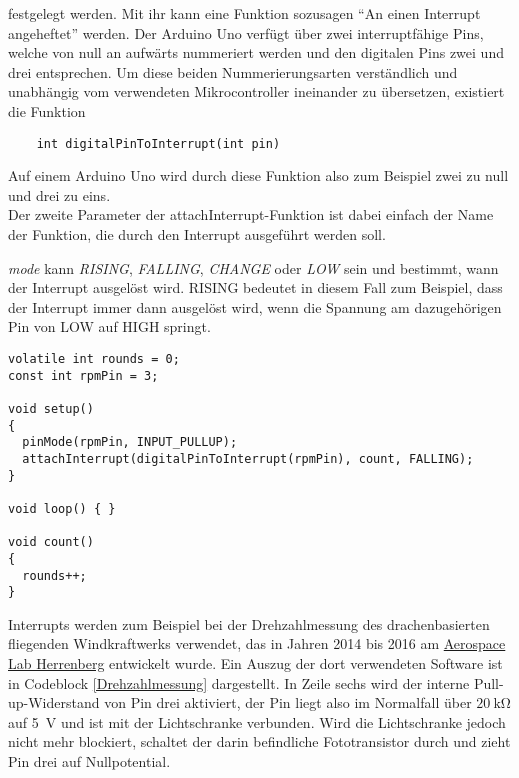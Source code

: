 \documentclass[10pt,a4paper]{article}
\begin{document}
festgelegt werden. Mit ihr kann eine Funktion sozusagen "`An einen Interrupt angeheftet"' werden.
Der Arduino Uno verfügt über zwei interruptfähige Pins, welche von null an aufwärts nummeriert werden und den digitalen Pins zwei und drei entsprechen. Um diese beiden Nummerierungsarten verständlich und unabhängig vom verwendeten Mikrocontroller ineinander zu übersetzen, existiert die Funktion

\begin{lstlisting}
	int digitalPinToInterrupt(int pin)
\end{lstlisting}
Auf einem Arduino Uno wird durch diese Funktion also zum Beispiel zwei zu null und drei zu eins.\\

Der zweite Parameter der attachInterrupt-Funktion ist dabei einfach der Name der Funktion, die durch den Interrupt ausgeführt werden soll.

\emph{mode} kann \emph{RISING}, \emph{FALLING}, \emph{CHANGE} oder \emph{LOW} sein und bestimmt, wann der Interrupt ausgelöst wird. RISING bedeutet in diesem Fall zum Beispiel, dass der Interrupt immer dann ausgelöst wird, wenn die Spannung am dazugehörigen Pin von LOW auf HIGH springt.
\bigskip

\begin{lstlisting}[caption=Ausschnitt aus dem Programmcode einer Messbox des Windkraftwerks, label=Drehzahlmessung, style=multiline]
volatile int rounds = 0;
const int rpmPin = 3;

void setup()
{
  pinMode(rpmPin, INPUT_PULLUP);
  attachInterrupt(digitalPinToInterrupt(rpmPin), count, FALLING);
}

void loop() { }

void count()
{
  rounds++;
}
\end{lstlisting}
\vspace{0.5cm}

Interrupts werden zum Beispiel bei der Drehzahlmessung des drachenbasierten fliegenden Windkraftwerks verwendet, das in Jahren 2014 bis 2016 am \href{https://aerospace-lab.de/aerospace-lab-gewinnt-dlr-schuelerwettbewerb/}{Aerospace Lab Herrenberg} entwickelt wurde. Ein Auszug der dort verwendeten Software ist in Codeblock \ref{Drehzahlmessung} dargestellt. In Zeile sechs wird der interne Pull-up-Widerstand von Pin drei aktiviert, der Pin liegt also im Normalfall über $\SI{20}{\kilo\ohm}$ auf \SI{5}{V} und ist mit der Lichtschranke verbunden. Wird die Lichtschranke jedoch nicht mehr blockiert, schaltet der darin befindliche Fototransistor durch und zieht Pin drei auf Nullpotential.
\end{document}
